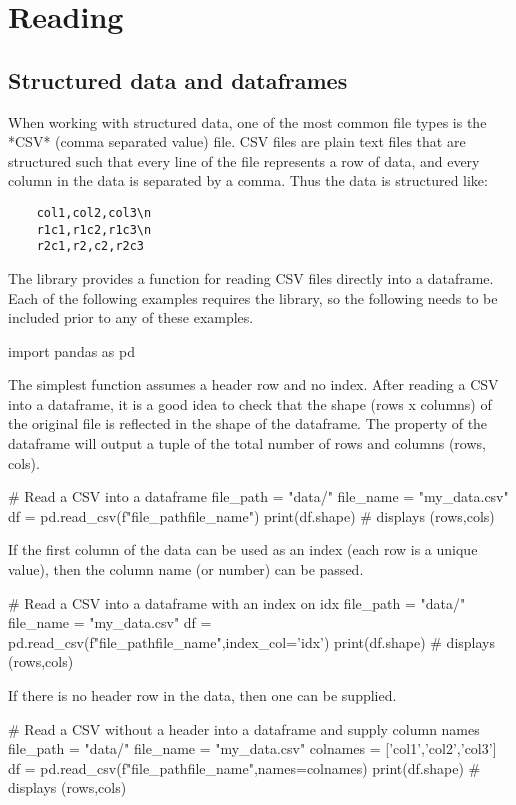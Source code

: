 \chapter{Reading}
\label{chapter:reading}

\section{Structured data and dataframes}

When working with structured data, one of the most common file types is the *CSV* (comma separated value) file. CSV files are plain text files that are structured such that every line of the file represents a row of data, and every column in the data is separated by a comma. Thus the data is structured like:

\begin{verbatim}
    col1,col2,col3\n
    r1c1,r1c2,r1c3\n
    r2c1,r2,c2,r2c3
\end{verbatim}

The  library provides a function for reading CSV files directly into a dataframe.
Each of the following examples requires the library, so the following  needs to be included prior to any of these examples.

\begin{pycode}
    import pandas as pd
\end{pycode}

The simplest  function assumes a header row and no index. After reading a CSV into a dataframe, it is a good idea to check that the shape (rows x columns) of the original  file is reflected in the shape of the dataframe. The  property of the dataframe will output a tuple of the total number of rows and columns (rows, cols).

\begin{pycode}
    # Read a CSV into a dataframe
    file_path = "data/"
    file_name = "my_data.csv"
    df = pd.read_csv(f"{file_path}{file_name}")
    print(df.shape) # displays (rows,cols)
\end{pycode}

If the first column of the data can be used as an index (each row is a unique value), then the column name (or number) can be passed.

\begin{pycode}
    # Read a CSV into a dataframe with an index on idx
    file_path = "data/"
    file_name = "my_data.csv"
    df = pd.read_csv(f"{file_path}{file_name}",index_col='idx')
    print(df.shape) # displays (rows,cols)
\end{pycode}

\newpage
If there is no header row in the data, then one can be supplied.

\begin{pycode}
    # Read a CSV without a header into a dataframe and supply column names
    file_path = "data/"
    file_name = "my_data.csv"
    colnames = ['col1','col2','col3']
    df = pd.read_csv(f"{file_path}{file_name}",names=colnames)
    print(df.shape) # displays (rows,cols)
\end{pycode}

